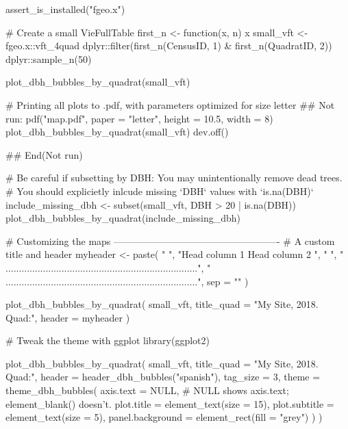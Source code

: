 \documentclass[a4paper]{book}
\begin{document}
%
\begin{Examples}
\begin{ExampleCode}
assert_is_installed("fgeo.x")

# Create a small VieFullTable
first_n <- function(x, n) x %
small_vft <- fgeo.x::vft_4quad %
  dplyr::filter(first_n(CensusID, 1) & first_n(QuadratID, 2)) %
  dplyr::sample_n(50)

plot_dbh_bubbles_by_quadrat(small_vft)

# Printing all plots to .pdf, with parameters optimized for size letter
## Not run: 
pdf("map.pdf", paper = "letter", height = 10.5, width = 8)
plot_dbh_bubbles_by_quadrat(small_vft)
dev.off()

## End(Not run)

# Be careful if subsetting by DBH: You may unintentionally remove dead trees.
# You should explicietly inlcude missing `DBH` values with `is.na(DBH)`
include_missing_dbh <- subset(small_vft, DBH > 20 | is.na(DBH))
plot_dbh_bubbles_by_quadrat(include_missing_dbh)

# Customizing the maps ----------------------------------------------------
# A custom title and header
myheader <- paste(
  " ",
  "Head column 1                     Head column 2                          ",
  " ",
  " ........................................................................",
  " ........................................................................",
  sep = "\n"
)

plot_dbh_bubbles_by_quadrat(
  small_vft,
  title_quad = "My Site, 2018. Quad:",
  header = myheader
)

# Tweak the theme with ggplot
library(ggplot2)

plot_dbh_bubbles_by_quadrat(
  small_vft,
  title_quad = "My Site, 2018. Quad:",
  header = header_dbh_bubbles("spanish"),
  tag_size = 3,
  theme = theme_dbh_bubbles(
    axis.text = NULL, # NULL shows axis.text; element_blank() doesn't.
    plot.title = element_text(size = 15),
    plot.subtitle = element_text(size = 5),
    panel.background = element_rect(fill = "grey")
  )
)
\end{ExampleCode}
\end{Examples}
%
\end{document}
